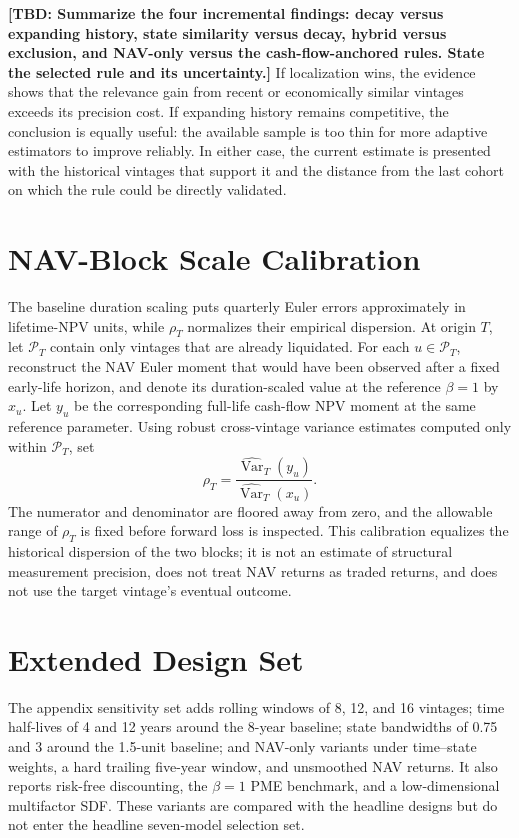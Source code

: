 \documentclass[11pt]{article}
\newcommand{\tbd}[1]{\textbf{[TBD: #1]}}
\begin{document}
\tbd{Summarize the four incremental findings: decay versus expanding history,
state similarity versus decay, hybrid versus exclusion, and NAV-only versus
the cash-flow-anchored rules. State the selected rule and its uncertainty.} If localization wins, the evidence shows that the
relevance gain from recent or economically similar vintages exceeds its
precision cost. If expanding history remains competitive, the conclusion is
equally useful: the available sample is too thin for more adaptive estimators
to improve reliably. In either case, the current estimate is presented with
the historical vintages that support it and the distance from the last cohort
on which the rule could be directly validated.

\appendix

\section{NAV-Block Scale Calibration}

The baseline duration scaling puts quarterly Euler errors approximately in
lifetime-NPV units, while $\rho_T$ normalizes their empirical dispersion. At
origin $T$, let $\mathcal P_T$ contain only vintages that are already
liquidated. For each $u\in\mathcal P_T$, reconstruct the NAV Euler moment that
would have been observed after a fixed early-life horizon, and denote its
duration-scaled value at the reference $\beta=1$ by $x_u$. Let $y_u$ be the
corresponding full-life cash-flow NPV moment at the same reference parameter.
Using robust cross-vintage variance estimates computed only within
$\mathcal P_T$, set
\[
\rho_T=\frac{\widehat{\operatorname{Var}}_T(y_u)}
              {\widehat{\operatorname{Var}}_T(x_u)}.
\]
The numerator and denominator are floored away from zero, and the allowable
range of $\rho_T$ is fixed before forward loss is inspected. This calibration
equalizes the historical dispersion of the two blocks; it is not an estimate
of structural measurement precision, does not treat NAV returns as traded
returns, and does not use the target vintage's eventual outcome.

\section{Extended Design Set}
\label{app:design}

The appendix sensitivity set adds rolling windows of 8, 12, and 16 vintages;
time half-lives of 4 and 12 years around the 8-year baseline; state
bandwidths of 0.75 and 3 around the 1.5-unit baseline; and NAV-only variants
under time--state weights, a hard trailing five-year window, and unsmoothed
NAV returns. It also reports risk-free discounting, the $\beta=1$ PME
benchmark, and a low-dimensional multifactor SDF. These variants are compared
with the headline designs but do not enter the headline seven-model selection
set.
\end{document}
